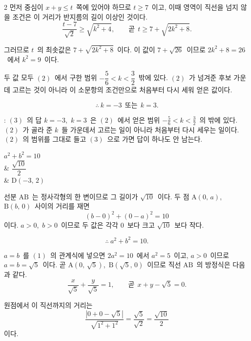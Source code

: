 \documentclass[10pt,fleqn]{article}
\begin{document}
\begin{multicols*}{2}
먼저 중심이 $x+y\le t$\ 쪽에 있어야 하므로 $t\ge 7$\ 이고, 이때 영역이 직선을 넘지 않을 조건은 이 거리가 반지름의 길이 이상인 것이다.
$$\dfrac{t-7}{\sqrt2}\ge\sqrt{k^{2}+4},\qquad \text{곧}\ \ t\ge 7+\sqrt{2k^{2}+8}.$$

그러므로 $t$\ 의 최솟값은 $7+\sqrt{2k^{2}+8}$\ 이다. 이 값이 $7+\sqrt{26}$\ 이므로 $2k^{2}+8=26$\ 에서 $k^{2}=9$\ 이다.

두 값 모두 $(2)$\ 에서 구한 범위 $-\dfrac56<k<\dfrac32$\ 밖에 있다. $(2)$\ 가 넘겨준 후보 가운데 고르는 것이 아니라 이 소문항의 조건만으로 처음부터 다시 세워 얻은 값이다.

$$\therefore\ k=-3\ \ \text{또는}\ \ k=3.$$

\begin{dmcriticalpoint}
: $(3)$\ 의 답 $k=-3$,\ $k=3$\ 은 $(2)$\ 에서 얻은 범위 $-\frac56<k<\frac32$\ 의 밖에 있다. $(2)$\ 가 골라 준 $k$\ 들 가운데서 고르는 일이 아니라 처음부터 다시 세우는 일이다. $(2)$\ 의 범위를 그대로 들고 $(3)$\ 으로 가면 답이 하나도 안 남는다.
\end{dmcriticalpoint}


\begin{dmanslist}
 $a^{2}+b^{2}=10$\\
&  $\dfrac{\sqrt{10}}{2}$\\
&  $\mathrm{D}(-3,\,2)$
\end{dmanslist}

 선분 $\mathrm{AB}$\ 는 정사각형의 한 변이므로 그 길이가 $\sqrt{10}$\ 이다. 두 점 $\mathrm{A}(0,\,a)$,\ $\mathrm{B}(b,\,0)$\ 사이의 거리를 재면
$$(b-0)^{2}+(0-a)^{2}=10$$
이다. $a>0$,\ $b>0$\ 이므로 두 값은 각각 $0$\ 보다 크고 $\sqrt{10}$\ 보다 작다.

$$\therefore\ a^{2}+b^{2}=10.$$

 $a=b$\ 를 $(1)$\ 의 관계식에 넣으면 $2a^{2}=10$\ 에서 $a^{2}=5$\ 이고, $a>0$\ 이므로 $a=b=\sqrt5$\ 이다. 곧 $\mathrm{A}(0,\,\sqrt5)$,\ $\mathrm{B}(\sqrt5,\,0)$\ 이므로 직선 $\mathrm{AB}$\ 의 방정식은 다음과 같다.
$$\dfrac{x}{\sqrt5}+\dfrac{y}{\sqrt5}=1,\qquad \text{곧}\ \ x+y-\sqrt5=0.$$

원점에서 이 직선까지의 거리는
$$\dfrac{|0+0-\sqrt5|}{\sqrt{1^{2}+1^{2}}}=\dfrac{\sqrt5}{\sqrt2}=\dfrac{\sqrt{10}}{2}$$
이다.


\end{multicols*}
\end{document}
